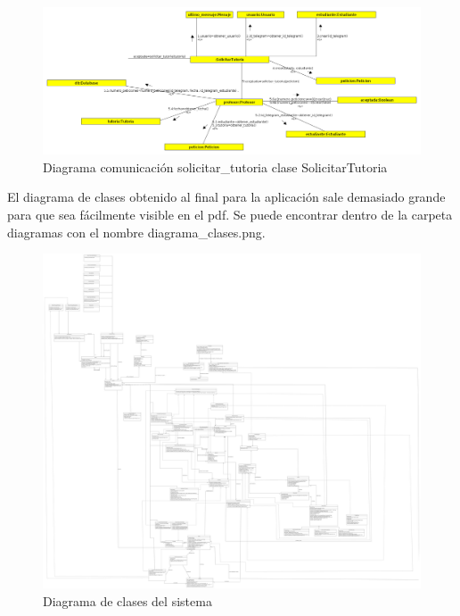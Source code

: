 \begin{figure}[H] %
\centering
\includegraphics[scale=0.2]{imagenes/diagramas/comunicacion/solicitar_tutoria_tutoria.png}  %

\caption{Diagrama comunicación solicitar\_tutoria clase  SolicitarTutoria}\label{figura112}
\end{figure}

El diagrama de clases obtenido al final para la aplicación sale demasiado grande para que sea fácilmente visible en el pdf. Se puede encontrar dentro de la carpeta diagramas con el nombre diagrama\_clases.png.

 \begin{figure}[H] %
\includegraphics[width=1\textwidth, right]{imagenes/diagramas/diagrama_clases.png}  %
\caption{Diagrama de clases del sistema}\label{figura10101}
\end{figure}
